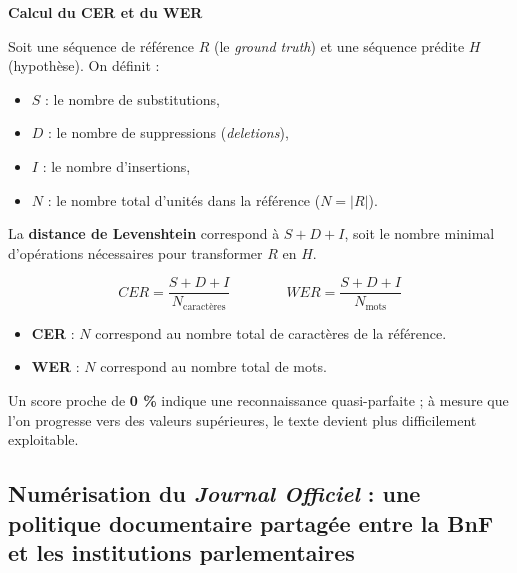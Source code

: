\begin{encadre}
\textbf{Calcul du CER et du WER}

Soit une séquence de référence $R$ (le \emph{ground truth}) et une séquence prédite $H$ (hypothèse).
On définit :

\begin{itemize}
\item $S$ : le nombre de substitutions,

\item $D$ : le nombre de suppressions (\emph{deletions}),

\item $I$ : le nombre d’insertions,

\item $N$ : le nombre total d’unités dans la référence ($N = |R|$).

\end{itemize}
La \textbf{distance de Levenshtein} correspond à $S + D + I$, soit le nombre minimal d’opérations nécessaires pour transformer $R$ en $H$.

$$
CER = \frac{S + D + I}{N_\text{caractères}}
\qquad\qquad
WER = \frac{S + D + I}{N_\text{mots}}
$$
\begin{itemize}
\item \textbf{CER} : $N$ correspond au nombre total de caractères de la référence.

\item \textbf{WER} : $N$ correspond au nombre total de mots.
\end{itemize}
Un score proche de \textbf{0 \%} indique une reconnaissance quasi-parfaite ; à mesure que l'on progresse vers des valeurs supérieures, le texte devient plus difficilement exploitable.

\end{encadre}
\subsection{Numérisation du \emph{Journal Officiel} : une politique documentaire partagée entre la BnF et les institutions parlementaires}

